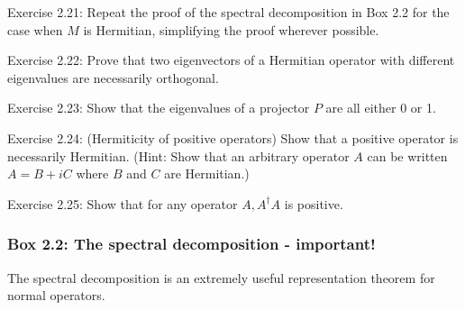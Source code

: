 \begin{exercise}
Exercise 2.21: Repeat the proof of the spectral decomposition in Box 2.2 for the case when $M$ is Hermitian, simplifying the proof wherever possible.
\end{exercise}

\begin{exercise}
Exercise 2.22: Prove that two eigenvectors of a Hermitian operator with different eigenvalues are necessarily orthogonal.
\end{exercise}

\begin{exercise}
Exercise 2.23: Show that the eigenvalues of a projector $P$ are all either 0 or 1.
\end{exercise}

\begin{exercise}
Exercise 2.24: (Hermiticity of positive operators) Show that a positive operator is necessarily Hermitian. (Hint: Show that an arbitrary operator $A$ can be written $A=B+i C$ where $B$ and $C$ are Hermitian.)
\end{exercise}

\begin{exercise}
Exercise 2.25: Show that for any operator $A, A^{\dagger} A$ is positive.
\end{exercise}

\subsubsection{Box 2.2: The spectral decomposition - important!}

The spectral decomposition is an extremely useful representation theorem for normal operators.

